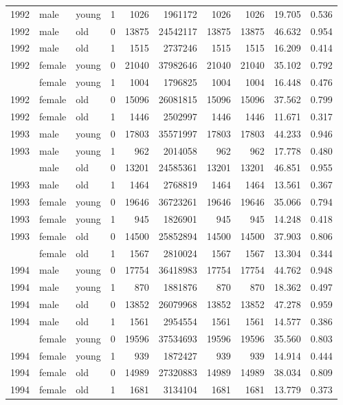 \begin{table}
\begin{tabular}[t]{rllrrrrrrr}
1992 & male & young & 1 & 1026 & 1961172 & 1026 & 1026 & 19.705 & 0.536\\
1992 & male & old & 0 & 13875 & 24542117 & 13875 & 13875 & 46.632 & 0.954\\
1992 & male & old & 1 & 1515 & 2737246 & 1515 & 1515 & 16.209 & 0.414\\
1992 & female & young & 0 & 21040 & 37982646 & 21040 & 21040 & 35.102 & 0.792\\
\addlinespace
1992 & female & young & 1 & 1004 & 1796825 & 1004 & 1004 & 16.448 & 0.476\\
1992 & female & old & 0 & 15096 & 26081815 & 15096 & 15096 & 37.562 & 0.799\\
1992 & female & old & 1 & 1446 & 2502997 & 1446 & 1446 & 11.671 & 0.317\\
1993 & male & young & 0 & 17803 & 35571997 & 17803 & 17803 & 44.233 & 0.946\\
1993 & male & young & 1 & 962 & 2014058 & 962 & 962 & 17.778 & 0.480\\
\addlinespace
1993 & male & old & 0 & 13201 & 24585361 & 13201 & 13201 & 46.851 & 0.955\\
1993 & male & old & 1 & 1464 & 2768819 & 1464 & 1464 & 13.561 & 0.367\\
1993 & female & young & 0 & 19646 & 36723261 & 19646 & 19646 & 35.066 & 0.794\\
1993 & female & young & 1 & 945 & 1826901 & 945 & 945 & 14.248 & 0.418\\
1993 & female & old & 0 & 14500 & 25852894 & 14500 & 14500 & 37.903 & 0.806\\
\addlinespace
1993 & female & old & 1 & 1567 & 2810024 & 1567 & 1567 & 13.304 & 0.344\\
1994 & male & young & 0 & 17754 & 36418983 & 17754 & 17754 & 44.762 & 0.948\\
1994 & male & young & 1 & 870 & 1881876 & 870 & 870 & 18.362 & 0.497\\
1994 & male & old & 0 & 13852 & 26079968 & 13852 & 13852 & 47.278 & 0.959\\
1994 & male & old & 1 & 1561 & 2954554 & 1561 & 1561 & 14.577 & 0.386\\
\addlinespace
1994 & female & young & 0 & 19596 & 37534693 & 19596 & 19596 & 35.560 & 0.803\\
1994 & female & young & 1 & 939 & 1872427 & 939 & 939 & 14.914 & 0.444\\
1994 & female & old & 0 & 14989 & 27320883 & 14989 & 14989 & 38.034 & 0.809\\
1994 & female & old & 1 & 1681 & 3134104 & 1681 & 1681 & 13.779 & 0.373\\

\end{tabular}
\end{table}

